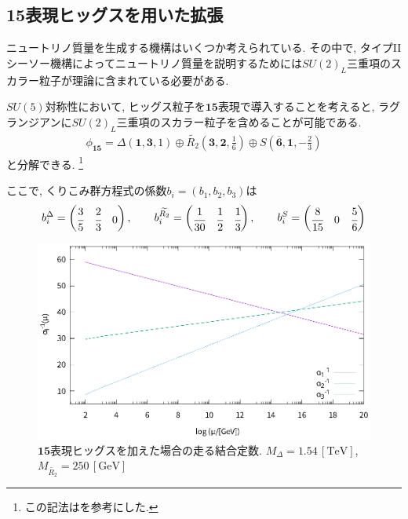 \subsection{15表現ヒッグスを用いた拡張}
ニュートリノ質量を生成する機構はいくつか考えられている.
その中で, タイプIIシーソー機構によってニュートリノ質量を説明するためには$SU(2)_L$三重項のスカラー粒子が理論に含まれている必要がある.

$SU(5)$対称性において, ヒッグス粒子を$\bm{15}$表現で導入することを考えると, ラグランジアンに$SU(2)_L$三重項のスカラー粒子を含めることが可能である.
\begin{align}
  \phi_{\bm{15}} = \Delta \left(\bm{1}, \bm{3}, 1\right) \oplus \widetilde{R_2}\left(\bm{3}, \bm{2},\frac{1}{6}\right)\oplus S\left(\overline{\bm{6}}, \bm{1}, -\frac{2}{3}\right)
\end{align}
と分解できる.
\footnote{
  この記法は\cite{dorsnerPhysicsLeptoquarksPrecision2016}を参考にした.
}

ここで, くりこみ群方程式の係数$b_i=(b_1, b_2, b_3)$は
\begin{align}
  b_i^\Delta=\begin{pmatrix}
    \cfrac{3}{5} & \cfrac{2}{3} & 0
  \end{pmatrix},\qquad
  b_i^{\widetilde{R_2}}=\begin{pmatrix}
    \cfrac{1}{30} & \cfrac{1}{2} & \cfrac{1}{3}
  \end{pmatrix},\qquad
  b_i^{S}=\begin{pmatrix}
    \cfrac{8}{15} & 0 & \cfrac{5}{6}
  \end{pmatrix}
\end{align}

\begin{figure}[ht]
  \centering
  \includegraphics[width=12truecm,clip]{fig/RGE_15_1loop.eps}
  \caption{$\bm{15}$表現ヒッグスを加えた場合の走る結合定数. $M_\Delta=1.54\,[\mathrm{TeV}]$, $M_{\widetilde{R_2}}=250\,[\mathrm{GeV}]$ }
  \label{fig:RGE_15_1loop}
\end{figure}

